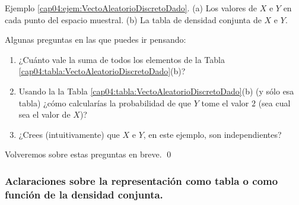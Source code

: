 \begin{ejemplo}
\begin{table}[p]
\begin{center}
\end{center}
\caption{Ejemplo \ref{cap04:ejem:VectoAleatorioDiscretoDado}. (a) Los valores de $X$ e $Y$ en cada punto del espacio muestral. (b) La tabla de densidad conjunta de $X$ e $Y$.}
\label{cap04:tabla:VectoAleatorioDiscretoDado}
\end{table}
Algunas preguntas en las que puedes ir pensando:
\begin{enumerate}
  \item ¿Cuánto vale la suma de todos los elementos de la Tabla \ref{cap04:tabla:VectoAleatorioDiscretoDado}(b)?
  \item Usando la la Tabla \ref{cap04:tabla:VectoAleatorioDiscretoDado}(b) (y sólo esa tabla) ¿cómo calcularías la probabilidad de que $Y$ tome el valor $2$ (sea cual sea el valor de $X$)?
  \item ¿Crees (intuitivamente) que $X$ e $Y$, en este ejemplo, son independientes?
\end{enumerate}
Volveremos sobre estas preguntas en breve.
\qed
\end{ejemplo}

\subsubsection{Aclaraciones sobre la representación como tabla o como función de la densidad conjunta.}

